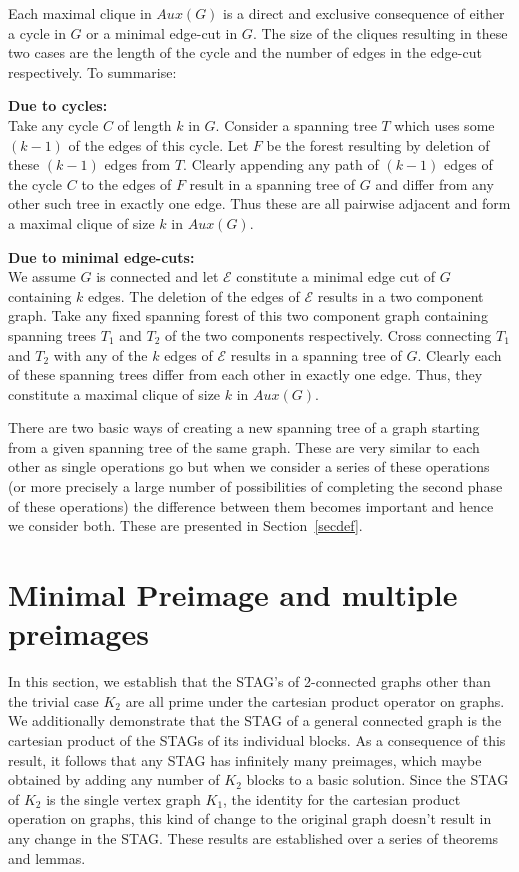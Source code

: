 \documentclass{llncs}
\begin{document}
Each maximal clique in $Aux(G)$ is a direct and exclusive consequence of either a cycle in $G$ or a minimal edge-cut in $G$. The size of the cliques resulting in these two cases are the length of the cycle and the number of edges in the edge-cut respectively. To summarise:

{\bf Due to cycles:}\\ Take any cycle $C$ of length $k$ in $G$. Consider a spanning tree $T$ which uses some $(k-1)$ of the edges of this cycle. Let $F$ be the forest resulting by deletion of these $(k-1)$ edges from $T$. Clearly appending any path of $(k-1)$ edges of the cycle $C$ to the edges of $F$ result in a spanning tree of $G$ and differ from any other such tree in exactly one edge. Thus these are all pairwise adjacent and form a maximal clique of size $k$ in $Aux(G)$. 

{\bf Due to minimal edge-cuts:}\\ We assume $G$ is connected and let $\mathcal{E}$ constitute a minimal edge cut of $G$ containing $k$ edges. The deletion of the edges of $\mathcal{E}$ results in a two component graph. Take any fixed spanning forest of this two component graph containing spanning trees $T_1$ and $T_2$ of the two components respectively. Cross connecting $T_1$ and $T_2$ with any of the $k$ edges of $\mathcal{E}$ results in a spanning tree of $G$. Clearly each of these spanning trees differ from each other in exactly one edge. Thus, they constitute a maximal clique of size $k$ in $Aux(G)$.

There are two basic ways of creating a new spanning tree of a graph starting from a given spanning tree of the same graph. These are very similar to each other as single operations go but when we consider a series of these operations (or more precisely a large number of possibilities of completing the second phase of these operations) the difference between them becomes important and hence we consider both. These are presented in Section~\ref{secdef}.

\section{Minimal Preimage and multiple preimages}\label{seccartprod}
In this section, we establish that the STAG's of 2-connected graphs other than the trivial case $K_2$ are all prime under the cartesian product operator on graphs. We additionally demonstrate that the STAG of a general connected graph is the cartesian product of the STAGs of its individual blocks. As a consequence of this result, it follows that any STAG has infinitely many preimages, which maybe obtained by adding any number of $K_2$ blocks to a basic solution. Since the STAG of $K_2$ is the single vertex graph $K_1$, the identity for the cartesian product operation on graphs, this kind of change to the original graph doesn't result in any change in the STAG. These results are established over a series of theorems and lemmas.
\end{document}
